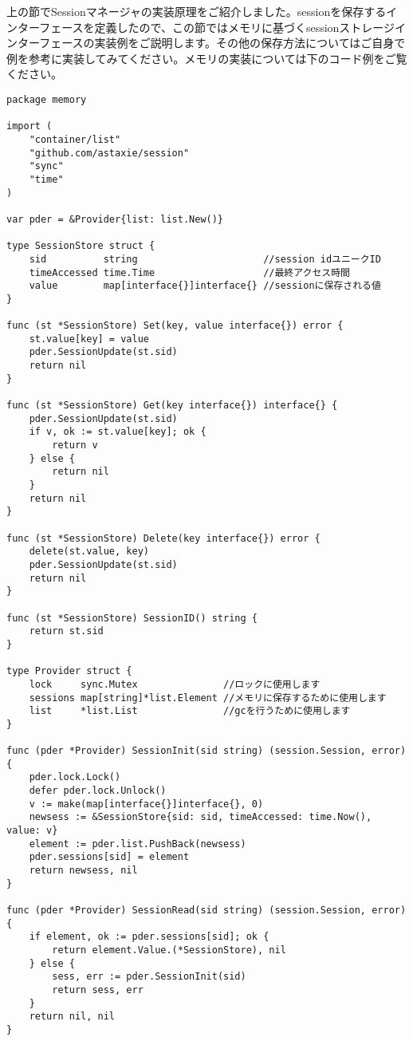 上の節でSessionマネージャの実装原理をご紹介しました。sessionを保存するインターフェースを定義したので、この節ではメモリに基づくsessionストレージインターフェースの実装例をご説明します。その他の保存方法についてはご自身で例を参考に実装してみてください。メモリの実装については下のコード例をご覧ください。

\begin{lstlisting}[numbers=none]
package memory

import (
    "container/list"
    "github.com/astaxie/session"
    "sync"
    "time"
)

var pder = &Provider{list: list.New()}

type SessionStore struct {
    sid          string                      //session idユニークID
    timeAccessed time.Time                   //最終アクセス時間
    value        map[interface{}]interface{} //sessionに保存される値
}

func (st *SessionStore) Set(key, value interface{}) error {
    st.value[key] = value
    pder.SessionUpdate(st.sid)
    return nil
}

func (st *SessionStore) Get(key interface{}) interface{} {
    pder.SessionUpdate(st.sid)
    if v, ok := st.value[key]; ok {
        return v
    } else {
        return nil
    }
    return nil
}

func (st *SessionStore) Delete(key interface{}) error {
    delete(st.value, key)
    pder.SessionUpdate(st.sid)
    return nil
}

func (st *SessionStore) SessionID() string {
    return st.sid
}

type Provider struct {
    lock     sync.Mutex               //ロックに使用します
    sessions map[string]*list.Element //メモリに保存するために使用します
    list     *list.List               //gcを行うために使用します
}

func (pder *Provider) SessionInit(sid string) (session.Session, error) {
    pder.lock.Lock()
    defer pder.lock.Unlock()
    v := make(map[interface{}]interface{}, 0)
    newsess := &SessionStore{sid: sid, timeAccessed: time.Now(), value: v}
    element := pder.list.PushBack(newsess)
    pder.sessions[sid] = element
    return newsess, nil
}

func (pder *Provider) SessionRead(sid string) (session.Session, error) {
    if element, ok := pder.sessions[sid]; ok {
        return element.Value.(*SessionStore), nil
    } else {
        sess, err := pder.SessionInit(sid)
        return sess, err
    }
    return nil, nil
}


\end{lstlisting}
